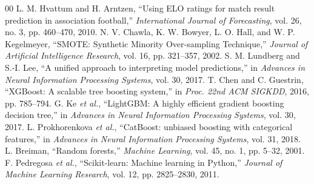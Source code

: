 \documentclass[conference]{IEEEtran}
\begin{document}
\begin{thebibliography}{00}
 L. M. Hvattum and H. Arntzen, ``Using ELO ratings for match result prediction in association football,'' \emph{International Journal of Forecasting}, vol. 26, no. 3, pp. 460--470, 2010.
 N. V. Chawla, K. W. Bowyer, L. O. Hall, and W. P. Kegelmeyer, ``SMOTE: Synthetic Minority Over-sampling Technique,'' \emph{Journal of Artificial Intelligence Research}, vol. 16, pp. 321--357, 2002.
 S. M. Lundberg and S.-I. Lee, ``A unified approach to interpreting model predictions,'' in \emph{Advances in Neural Information Processing Systems}, vol. 30, 2017.
 T. Chen and C. Guestrin, ``XGBoost: A scalable tree boosting system,'' in \emph{Proc. 22nd ACM SIGKDD}, 2016, pp. 785--794.
 G. Ke \emph{et al.}, ``LightGBM: A highly efficient gradient boosting decision tree,'' in \emph{Advances in Neural Information Processing Systems}, vol. 30, 2017.
 L. Prokhorenkova \emph{et al.}, ``CatBoost: unbiased boosting with categorical features,'' in \emph{Advances in Neural Information Processing Systems}, vol. 31, 2018.
 L. Breiman, ``Random forests,'' \emph{Machine Learning}, vol. 45, no. 1, pp. 5--32, 2001.
 F. Pedregosa \emph{et al.}, ``Scikit-learn: Machine learning in Python,'' \emph{Journal of Machine Learning Research}, vol. 12, pp. 2825--2830, 2011.
\end{thebibliography}
\end{document}
